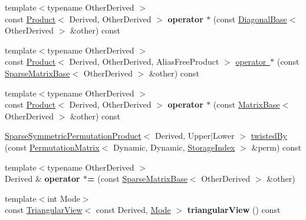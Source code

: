 \begin{DoxyCompactItemize}
{\footnotesize template$<$typename Other\+Derived $>$ }\\const \mbox{\hyperlink{class_eigen_1_1_product}{Product}}$<$ Derived, Other\+Derived $>$ {\bfseries operator $\ast$} (const \mbox{\hyperlink{class_eigen_1_1_diagonal_base}{Diagonal\+Base}}$<$ Other\+Derived $>$ \&other) const
\item 
{\footnotesize template$<$typename Other\+Derived $>$ }\\const \mbox{\hyperlink{class_eigen_1_1_product}{Product}}$<$ Derived, Other\+Derived, Alias\+Free\+Product $>$ \mbox{\hyperlink{class_eigen_1_1_sparse_matrix_base_a71198810da2882cf0234ad5a08d4500f}{operator $\ast$}} (const \mbox{\hyperlink{class_eigen_1_1_sparse_matrix_base}{Sparse\+Matrix\+Base}}$<$ Other\+Derived $>$ \&other) const
\item 
\mbox{\label{class_eigen_1_1_sparse_matrix_base_a7eba7a063c8db0114e0d512883f1d895}} 
{\footnotesize template$<$typename Other\+Derived $>$ }\\const \mbox{\hyperlink{class_eigen_1_1_product}{Product}}$<$ Derived, Other\+Derived $>$ {\bfseries operator $\ast$} (const \mbox{\hyperlink{class_eigen_1_1_matrix_base}{Matrix\+Base}}$<$ Other\+Derived $>$ \&other) const
\item 
\mbox{\hyperlink{class_eigen_1_1_sparse_symmetric_permutation_product}{Sparse\+Symmetric\+Permutation\+Product}}$<$ Derived, Upper$\vert$Lower $>$ \mbox{\hyperlink{class_eigen_1_1_sparse_matrix_base_a51d4898bd6a57cc3ba543a39b102423e}{twisted\+By}} (const \mbox{\hyperlink{class_eigen_1_1_permutation_matrix}{Permutation\+Matrix}}$<$ Dynamic, Dynamic, \mbox{\hyperlink{class_eigen_1_1_sparse_matrix_base_a0b540ba724726ebe953f8c0df06081ed}{Storage\+Index}} $>$ \&perm) const
\item 
\mbox{\label{class_eigen_1_1_sparse_matrix_base_a1a1ddcf83bb86c8c6823cd5ef66f784b}} 
{\footnotesize template$<$typename Other\+Derived $>$ }\\Derived \& {\bfseries operator $\ast$=} (const \mbox{\hyperlink{class_eigen_1_1_sparse_matrix_base}{Sparse\+Matrix\+Base}}$<$ Other\+Derived $>$ \&other)
\item 
\mbox{\label{class_eigen_1_1_sparse_matrix_base_a6762232f126791a057dfbf3bf6014542}} 
{\footnotesize template$<$int Mode$>$ }\\const \mbox{\hyperlink{class_eigen_1_1_triangular_view}{Triangular\+View}}$<$ const Derived, \mbox{\hyperlink{struct_mode}{Mode}} $>$ {\bfseries triangular\+View} () const

\end{DoxyCompactItemize}
